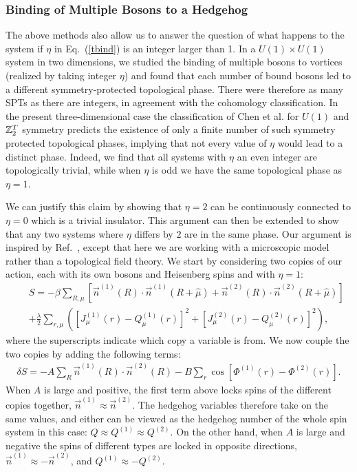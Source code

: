 \subsubsection{Binding of Multiple Bosons to a Hedgehog}
The above methods also allow us to answer the question of what happens to the system if $\eta$ in Eq.~(\ref{tbind}) is an integer larger than 1.  In a $U(1)\times U(1)$ system in two dimensions, we studied the binding of multiple bosons to vortices (realized by taking integer $\eta$) and found that each number of bound bosons led to a different symmetry-protected topological phase.\cite{FQHE} There were therefore as many SPTs as there are integers, in agreement with the cohomology classification.\cite{WenScience,WenPRB, LuVishwanath} In the present three-dimensional case the classification of Chen et al.\cite{WenScience,WenPRB} for $U(1)$ and $\mathbb{Z}_2^T$ symmetry predicts the existence of only a finite number of such symmetry protected topological phases, implying that not every value of $\eta$ would lead to a distinct phase. Indeed, we find that all systems with $\eta$ an even integer are topologically trivial, while when $\eta$ is odd we have the same topological phase as $\eta=1$. 

We can justify this claim by showing that $\eta=2$ can be continuously connected to $\eta=0$ which is a trivial insulator. This argument can then be extended to show that any two systems where $\eta$ differs by $2$ are in the same phase.  Our argument is inspired by Ref.~\cite{BiRasmussenXu13}, except that here we are working with a microscopic model rather than a topological field theory.
We start by considering two copies of our action, each with its own bosons and Heisenberg spins and with $\eta=1$:
\begin{eqnarray}
&&S=-\beta\sum_{R,\mu}\left[ \vec{n}^{(1)}(R)\cdot \vec{n}^{(1)}(R+\hat{\mu})+\vec{n}^{(2)}(R)\cdot \vec{n}^{(2)}(R+\hat{\mu})\right]\nonumber\\
&&+\frac{\lambda}{2}\sum_{r,\mu}\left( [ J_\mu^{(1)}(r)- Q_\mu^{(1)}(r)]^2+[ J_\mu^{(2)}(r)- Q_\mu^{(2)}(r)]^2\right),
\label{doubleaction}
\end{eqnarray}
where the superscripts indicate which copy a variable is from.  We now couple the two copies by adding the following terms:
\begin{eqnarray}
\delta S=-A\sum_{R} \vec{n}^{(1)}(R)\cdot \vec{n}^{(2)}(R)
-B\sum_{r} \cos[\Phi^{(1)}(r)-\Phi^{(2)}(r)].
\label{AB}
\end{eqnarray} 
When $A$ is large and positive, the first term above locks spins of the different copies together, $\vec{n}^{(1)}\approx\vec{n}^{(2)}$. The hedgehog variables therefore take on the same values, and either can be viewed as the hedgehog number of the whole spin system in this case: $Q \approx Q^{(1)} \approx Q^{(2)}$. On the other hand, when $A$ is large and negative the spins of different types are locked in opposite directions,  $\vec{n}^{(1)}\approx -\vec{n}^{(2)}$, and $Q^{(1)} \approx -Q^{(2)}$.

